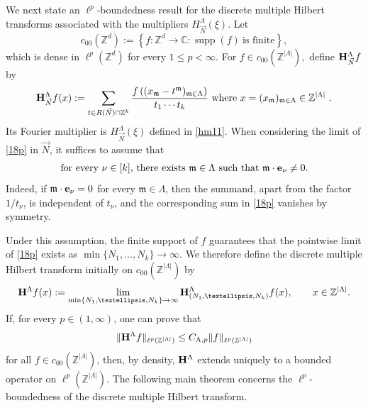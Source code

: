 \documentclass[10pt,a4paper]{amsart}
\numberwithin{equation}{section}
\begin{document}
 

We next state an $\ell^p$-boundedness result for the discrete
multiple Hilbert transforms associated with the multipliers
$H^\Lambda_{\vec N}(\xi)$. Let
\[
c_{00}(\mathbb{Z}^d)
:=
\left\{
f:\mathbb{Z}^d\to\mathbb{C}
:
\operatorname{supp}(f)\ \text{is finite}
\right\},
\]
which  is dense in
$\ell^p(\mathbb{Z}^d)$ for every $1\leq p<\infty$.  For  
$f\in c_{00}(\mathbb{Z}^{|\Lambda|}),$ define
${\bf H}^{\Lambda}_{\vec N}f$  by
\begin{align}\label{18p}
	{\bf H}^{\Lambda}_{\vec N}f(x)
	:=
	\sum_{t\in R(\vec N)\cap\mathbb{Z}^k}
	\frac{
		f\left(
		(x_{\mathfrak m}-t^{\mathfrak m})_{\mathfrak m\in\Lambda}
		\right)
	}{
		t_1\cdots t_k
	}\ \text{where $x=(x_{\mathfrak m})_{\mathfrak m\in\Lambda}
		\in\mathbb{Z}^{|\Lambda|}$ }.
\end{align}
Its Fourier multiplier is $H_{\vec N}^{\Lambda}(\xi)$ defined in
\eqref{hm11}. 
When considering the limit of  \eqref{18p} in $\vec{N}$,
it suffices to assume that
\begin{align*}
	\text{for every $\nu\in[k]$, there exists $\mathfrak m\in\Lambda$
		such that $\mathfrak m\cdot{\bf e}_\nu\neq0$.}
\end{align*}
Indeed, if $\mathfrak m\cdot{\bf e}_\nu=0$ for every
$\mathfrak m\in\Lambda$, then the summand, apart from the factor
$1/t_\nu$, is independent of $t_\nu$, and the corresponding sum in \eqref{18p} 
vanishes by symmetry.

Under this assumption, the finite support of $f$ guarantees that the
pointwise limit of \eqref{18p} exists as
$\min\{N_1,\ldots,N_k\}\to\infty$.
 We therefore define the discrete
multiple Hilbert transform initially on
$c_{00}(\mathbb{Z}^{|\Lambda|})$ by
\begin{align}\label{s2}
	{\bf H}^{\Lambda}f(x)
	:=
	\lim_{\min\{N_1,\ldots,N_k\}\to\infty}
	{\bf H}^{\Lambda}_{(N_1,\ldots,N_k)}f(x),
	\qquad
	x\in\mathbb{Z}^{|\Lambda|}.
\end{align}
If, for every $p\in(1,\infty)$, one can prove that
\[
\|{\bf H}^{\Lambda}f\|_{\ell^p(\mathbb{Z}^{|\Lambda|})}
\leq
C_{\Lambda,p}
\|f\|_{\ell^p(\mathbb{Z}^{|\Lambda|})}
\]
for all $f\in c_{00}(\mathbb{Z}^{|\Lambda|})$, then, by density,
${\bf H}^{\Lambda}$ extends uniquely to a bounded operator on
$\ell^p(\mathbb{Z}^{|\Lambda|})$. The following main theorem concerns the $\ell^p$-boundedness of the discrete multiple Hilbert transform.
\end{document}
